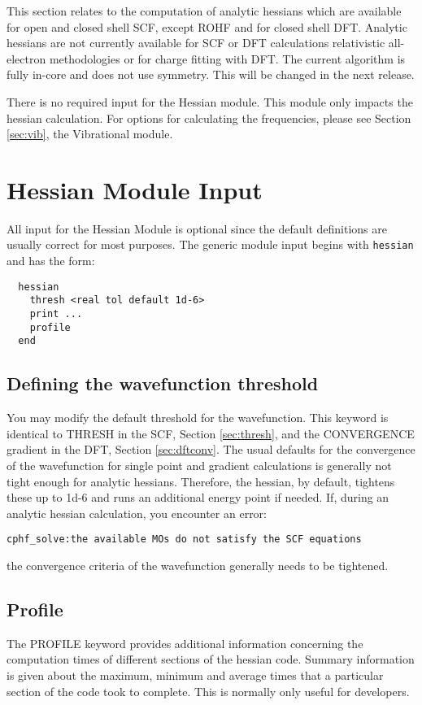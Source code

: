 \label{sec:hess}

This section relates to the computation of analytic hessians which
are available for open and closed shell SCF, except ROHF and for closed shell
DFT.  Analytic hessians are not currently available for SCF or DFT
calculations relativistic all-electron methodologies or for charge fitting with DFT.  The current
algorithm is fully in-core and does not use symmetry.  This will be
changed in the next release.

There is no required input for the Hessian module.  This module only
impacts the hessian calculation.  For options for calculating the
frequencies, please see Section \ref{sec:vib}, the Vibrational module.

\section{Hessian Module Input}

All input for the Hessian Module is optional since the default
definitions are usually correct for most purposes.  
The generic module input begins with \verb+hessian+
and has the form:
\begin{verbatim}
  hessian
    thresh <real tol default 1d-6>
    print ...
    profile
  end
\end{verbatim}

\subsection{Defining the wavefunction threshold}
You may modify the default threshold for the wavefunction.  This keyword
is identical to THRESH in the SCF, Section \ref{sec:thresh}, and the
CONVERGENCE gradient in the DFT, Section \ref{sec:dftconv}.  The usual
defaults for the convergence of the wavefunction for single point and
gradient calculations is generally not tight enough for analytic hessians.
Therefore, the hessian, by default, tightens these up to 1d-6 and runs
an additional energy point if needed.  If,
during an analytic hessian calculation, you encounter an error:
\begin{verbatim}
cphf_solve:the available MOs do not satisfy the SCF equations
\end{verbatim}
the convergence criteria of the wavefunction generally needs to be
tightened.

\subsection{Profile}
The PROFILE keyword provides additional information concerning the 
computation times of
different sections of the hessian code.  Summary information is
given about the maximum, minimum and average times that a particular
section of the code took to complete.  This is normally only useful
for developers.

